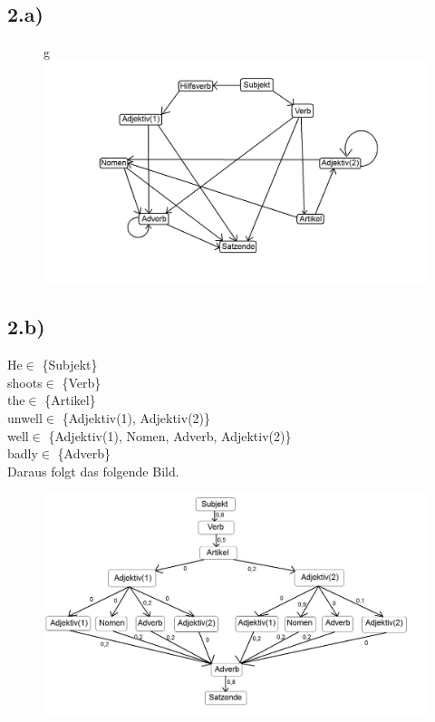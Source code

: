 \documentclass[a4paper]{article}
\begin{document}
\subsection*{2.a)}
\begin{figure}[!htbp]
\centering
g\includegraphics[width = 1\columnwidth]{blatt6aufgabe2a}
\end{figure}

\subsection*{2.b)}
\glqq He\grqq $\in$ \{Subjekt\} \\
\glqq shoots\grqq $\in$ \{Verb\} \\
\glqq the\grqq $\in$ \{Artikel\} \\
\glqq unwell\grqq $\in$ \{Adjektiv(1), Adjektiv(2)\} \\
\glqq well\grqq $\in$ \{Adjektiv(1), Nomen, Adverb, Adjektiv(2)\} \\
\glqq badly\grqq $\in$ \{Adverb\} \\
\pagebreak
Daraus folgt das folgende Bild.
\begin{figure}[!htbp]
\centering
\includegraphics[width = 1\columnwidth]{blatt6aufgabe2b}
\end{figure}
\end{document}
